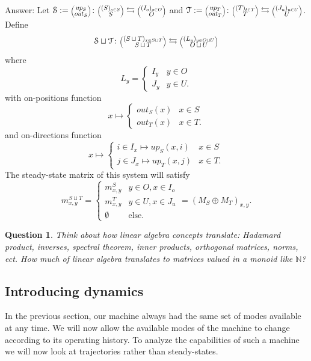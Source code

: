 \documentclass[12pt, a4paper]{article}
\theoremstyle{definition}
\theoremstyle{plain}
\theoremstyle{plain}
\theoremstyle{plain}
\theoremstyle{plain}
\newtheorem{question}[counter]{Question}
\theoremstyle{plain}
\theoremstyle{remark}
\theoremstyle{remark}
\newcommand{\mc}[1]{\mathcal{#1}}
\newcommand{\lens}[2]{\scaleobj{0.6}{\begin{pmatrix} \scaleobj{1.3}{{#1}} \\ \scaleobj{1.3}{{#2}} \end{pmatrix}}}
\begin{document}
Answer: Let $\mc{S} := \lens{up_S}{out_S} \colon \lens{(S)_{s \in S}}{S} \leftrightarrows \lens{(I_o)_{o \in O}}{O}$ and $\mc{T} := \lens{up_T}{out_T} \colon \lens{(T)_{t \in T}}{T} \leftrightarrows \lens{(J_u)_{u \in U}}{U}$. Define 
$$\mc{S} \sqcup \mc{T} \colon \lens{(S \sqcup T)_{x \in S \sqcup T}}{S \sqcup T} \leftrightarrows \lens{(L_y)_{y \in O \sqcup U}}{O \sqcup U}$$ 
where 
$$L_y = \begin{cases} I_y & y \in O \\ J_y & y \in U. \end{cases}$$
with on-positions function 
$$x \mapsto \begin{cases} out_S(x) & x \in S \\ out_T(x) & x \in T. \end{cases}$$ 
and on-directions function 
$$ x \mapsto \begin{cases} i \in I_x \mapsto up_S(x,i) & x \in S \\ j \in J_x \mapsto up_T(x,j) & x \in T. \end{cases}$$
The steady-state matrix of this system will satisfy 
$$m^{S \sqcup T}_{x,y} = \begin{cases} m^S_{x,y} & y \in O, x \in I_o \\  m^T_{x,y} & y \in U, x \in J_u \\ \emptyset & \text{else.} \end{cases} = (M_S \oplus M_T)_{x,y}.$$

\begin{question}
	Think about how linear algebra concepts translate: Hadamard product, inverses, spectral theorem, inner products, orthogonal matrices, norms, ect. How much of linear algebra translates to matrices valued in a monoid like $\mathbb{N}$?
\end{question}

\subsection{Introducing dynamics}
In the previous section, our machine always had the same set of modes available at any time. We will now allow the available modes of the machine to change according to its operating history. To analyze the capabilities of such a machine we will now look at trajectories rather than steady-states.
\end{document}

